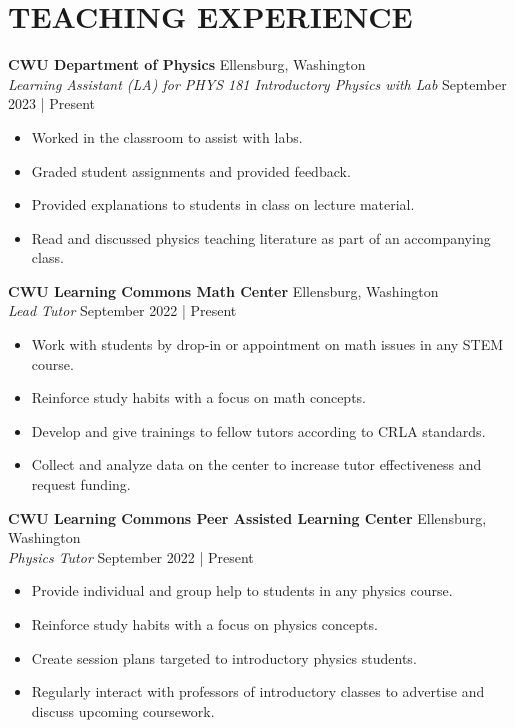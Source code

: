 \documentclass[a4paper,9pt]{extarticle}
\begin{document}
\section*{TEACHING EXPERIENCE}
\noindent\textbf{CWU Department of Physics} \hfill Ellensburg, Washington\\
\textit{Learning Assistant (LA) for PHYS 181 Introductory Physics with Lab} \hfill September 2023 | Present
\begin{itemize}
    \item Worked in the classroom to assist with labs.
    \item Graded student assignments and provided feedback.
    \item Provided explanations to students in class on lecture material.
    \item Read and discussed physics teaching literature as part of an accompanying class.
\end{itemize}

\noindent\textbf{CWU Learning Commons Math Center} \hfill Ellensburg, Washington\\
\textit{Lead Tutor} \hfill September 2022 | Present
\begin{itemize}
    \item Work with students by drop-in or appointment on math issues in any STEM course.
    \item Reinforce study habits with a focus on math concepts.
    \item Develop and give trainings to fellow tutors according to CRLA standards.
    \item Collect and analyze data on the center to increase tutor effectiveness and request funding.
\end{itemize}

\noindent\textbf{CWU Learning Commons Peer Assisted Learning Center} \hfill Ellensburg, Washington\\
\textit{Physics Tutor} \hfill September 2022 | Present
\begin{itemize}
    \item Provide individual and group help to students in any physics course.
    \item Reinforce study habits with a focus on physics concepts.
    \item Create session plans targeted to introductory physics students.
    \item Regularly interact with professors of introductory classes to advertise and discuss upcoming coursework.
\end{itemize}
\end{document}
